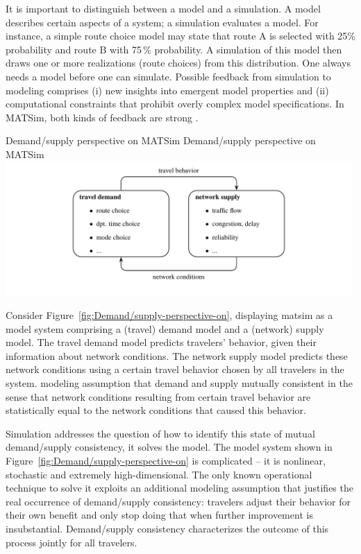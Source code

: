 It is important to distinguish between a \gls{model} and a \gls{simulation}. A
model describes certain aspects of a system; a simulation evaluates
a model. For instance, a simple route choice model may state that
route A is selected with 25\% probability and route B with 75\,\% probability.
A simulation of this model then draws one or more realizations (route
choices) from this distribution. One always needs a model before one
can simulate. Possible feedback from simulation to modeling comprises
(i) new insights into emergent model properties and (ii) computational
constraints that prohibit overly complex model specifications. In
MATSim, both kinds of feedback are strong .


\createfigure%
{Demand/supply perspective on MATSim}%
{Demand/supply perspective on MATSim}%
{\label{fig:Demand/supply-perspective-on}}%
{\includegraphics[width=0.99\textwidth, angle=0]{understanding/figures/mc/fig0.pdf}}%
{}

Consider Figure~\ref{fig:Demand/supply-perspective-on}, displaying
\gls{matsim} as a model system comprising a (travel) demand model and a
(network) supply model. The travel demand model predicts travelers' behavior,
given their information about  network conditions.
The network supply model predicts these network conditions using a
certain travel behavior chosen by all travelers in the system. 
 modeling assumption that demand
and supply  mutually consistent\corr{,}{} in the sense that
 network conditions resulting from  certain travel
behavior are statistically equal to the network conditions that caused this behavior.

Simulation addresses the question of how to identify this state of
mutual demand/supply consistency, \ie it solves the model. The model
system shown in Figure~\ref{fig:Demand/supply-perspective-on} is
complicated -- it is nonlinear, stochastic and extremely high-dimensional.
The only known operational technique to solve it exploits an additional modeling
assumption that justifies the real occurrence of demand/supply consistency:
travelers adjust their behavior for their own benefit and only
stop doing that when further improvement is insubstantial. Demand/supply
consistency characterizes the outcome of this process jointly for
all travelers.

